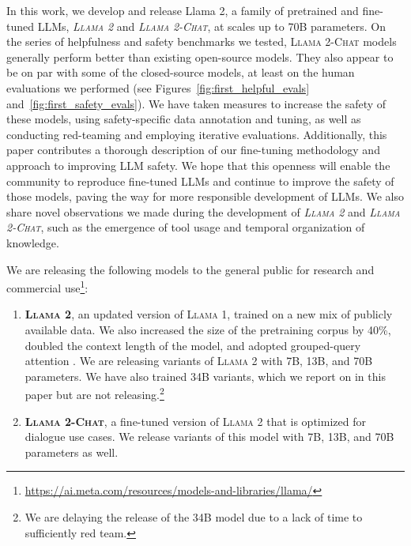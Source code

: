 In this work, we develop and release Llama 2, a family of pretrained and fine-tuned LLMs, \textit{\textsc{Llama 2}} and \textit{\textsc{Llama 2-Chat}}, at scales up to 70B parameters. On the series of helpfulness and safety benchmarks we tested, \textsc{Llama 2-Chat} models generally perform better than existing open-source models. They also appear to be on par with some of the closed-source models, at least on the human evaluations we performed (see Figures~\ref{fig:first_helpful_evals} and~\ref{fig:first_safety_evals}). We have taken measures to increase the safety of these models, using safety-specific data annotation and tuning, as well as conducting red-teaming and employing iterative evaluations. Additionally, this paper contributes a thorough description of our fine-tuning methodology and approach to improving LLM safety. We hope that this openness will enable the community to reproduce fine-tuned LLMs and continue to improve the safety of those models, paving the way for more responsible development of LLMs. We also share novel observations we made during the development of \textit{\textsc{Llama 2}} and \textit{\textsc{Llama 2-Chat}}, such as the emergence of tool usage and temporal organization of knowledge.

We are releasing the following models to the general public for research and commercial use\footnote{\url{https://ai.meta.com/resources/models-and-libraries/llama/}}:

\begin{enumerate}
  \item \textbf{\textsc{Llama 2}}, an updated version of \textsc{Llama 1}, trained on a new mix of publicly available data. We also increased the size of the pretraining corpus by 40\%, doubled the context length of the model, and adopted grouped-query attention \citep{gqa2023}. We are releasing variants of \textsc{Llama 2} with 7B, 13B, and 70B parameters. We have also trained 34B variants, which we report on in this paper but are not releasing.\footnote{We are delaying the release of the 34B model due to a lack of time to sufficiently red team.}

  \item \textbf{\textsc{Llama 2-Chat}}, a fine-tuned version of \textsc{Llama 2} that is optimized for dialogue use cases. We release variants of this model with 7B, 13B, and 70B parameters as well.
\end{enumerate}

